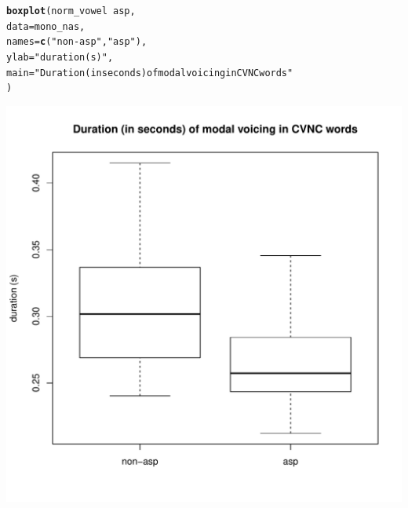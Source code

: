 \documentclass[a4paper,11pt]{article}\usepackage[]{graphicx}\usepackage[]{color}
\makeatletter
\def\maxwidth{ %
  \ifdim\Gin@nat@width>\linewidth
    \linewidth
  \else
    \Gin@nat@width
  \fi
}
\newcommand{\hlstr}[1]{\textcolor[rgb]{0.192,0.494,0.8}{#1}}%
\newcommand{\hlopt}[1]{\textcolor[rgb]{0,0,0}{#1}}%
\newcommand{\hlstd}[1]{\textcolor[rgb]{0.345,0.345,0.345}{#1}}%
\newcommand{\hlkwc}[1]{\textcolor[rgb]{0.333,0.667,0.333}{#1}}%
\newcommand{\hlkwd}[1]{\textcolor[rgb]{0.737,0.353,0.396}{\textbf{#1}}}%
\newenvironment{kframe}{%
 \def\at@end@of@kframe{}%
 \ifinner\ifhmode%
  \def\at@end@of@kframe{\end{minipage}}%
  \begin{minipage}{\columnwidth}%
 \fi\fi%
 \def\FrameCommand##1{\hskip\@totalleftmargin \hskip-\fboxsep
 \colorbox{shadecolor}{##1}\hskip-\fboxsep
     \hskip-\linewidth \hskip-\@totalleftmargin \hskip\columnwidth}%
 \MakeFramed {\advance\hsize-\width
   \@totalleftmargin\z@ \linewidth\hsize
   \@setminipage}}%
 {\par\unskip\endMakeFramed%
 \at@end@of@kframe}
\newenvironment{knitrout}{}{} %
\makeatother
\begin{document}
\begin{knitrout}
\color{fgcolor}\begin{kframe}
\begin{alltt}
\hlkwd{boxplot}\hlstd{(norm_vowel} \hlopt{~} \hlstd{asp,}
        \hlkwc{data} \hlstd{= mono_nas,}
        \hlkwc{names} \hlstd{=} \hlkwd{c}\hlstd{(}\hlstr{"non-asp"}\hlstd{,} \hlstr{"asp"}\hlstd{),}
        \hlkwc{ylab} \hlstd{=} \hlstr{"duration (s)"}\hlstd{,}
        \hlkwc{main} \hlstd{=} \hlstr{"Duration (in seconds) of modal voicing in CVNC words"}
        \hlstd{)}
\end{alltt}
\end{kframe}
\includegraphics[width=\maxwidth]{img/mono-nas-box-1} 

\end{knitrout}
\end{document}
